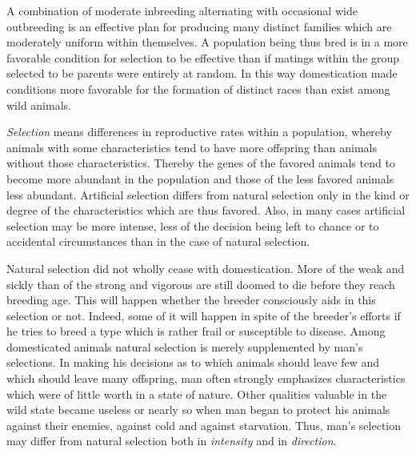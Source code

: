 A combination of moderate inbreeding alternating with occasional wide outbreeding is an effective plan for producing many 
distinct families which are moderately uniform within themselves. A population being thus bred is in a more favorable 
condition for selection to be effective than if matings within the group selected to be parents were entirely at random. In 
this way domestication made conditions more favorable for the formation of distinct races than exist among wild animals. 

\textit{Selection} means differences in reproductive rates within a population, whereby animals with some characteristics 
tend to have more offspring than animals without those characteristics. Thereby the genes of the favored animals tend to 
become more abundant in the population and those of the less favored animals less abundant. Artificial selection differs 
from natural selection only in the kind or degree of the characteristics which are thus favored. Also, in many cases 
artificial selection may be more intense, less of the decision being left to chance or to accidental circumstances than in 
the case of natural selection.

Natural selection did not wholly cease with domestication. More of the weak and sickly than of the strong and vigorous are 
still doomed to die before they reach breeding age. This will happen whether the breeder consciously aids in this selection 
or not. Indeed, some of it will happen in spite of the breeder's efforts if he tries to breed a type which is rather frail 
or susceptible to disease. Among domesticated animals natural selection is merely supplemented by man's selections. In 
making his decisions as to which animals should leave few and which should leave many offspring, man often strongly 
emphasizes characteristics which were of little worth in a state of nature. Other qualities valuable in the wild state 
became useless or nearly so when man began to protect his animals against their enemies, against cold and against 
starvation. Thus, man's selection may differ from natural selection both in \textit{intensity} and in \textit{direction}.

